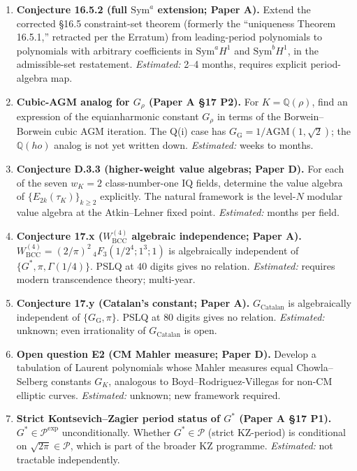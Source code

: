 \documentclass[11pt]{amsart}
\newcommand{\Gs}{G^{*}}
\newcommand{\GG}{G_{\!\scriptscriptstyle\mathrm{G}}}
\newcommand{\GK}{G_{K}}
\newcommand{\Q}{\mathbb{Q}}
\begin{document}
\begin{enumerate}[label=\textbf{(\Roman*)}, leftmargin=*, itemsep=4pt]
\item \textbf{Conjecture 16.5.2 (full $\mathrm{Sym}^{a}$ extension; Paper A).} Extend
the corrected \S 16.5 constraint-set theorem (formerly the ``uniqueness
Theorem 16.5.1,'' retracted per the Erratum) from leading-period
polynomials to polynomials with arbitrary coefficients in $\mathrm{Sym}^{a}H^{1}$
and $\mathrm{Sym}^{b}H^{1}$, in the admissible-set restatement. \emph{Estimated:} 2--4 months, requires
explicit period-algebra map.

\item \textbf{Cubic-AGM analog for $G_{\rho}$ (Paper A \S 17 P2).} For
$K = \Q(\rho)$, find an expression of the equianharmonic constant
$G_{\rho}$ in terms of the Borwein--Borwein cubic AGM iteration. The
Q(i) case has $\GG = 1/\mathrm{AGM}(1, \sqrt 2)$; the $\Q(
ho)$ analog is
not yet written down. \emph{Estimated:} weeks to months.

\item \textbf{Conjecture D.3.3 (higher-weight value algebras; Paper D).}
For each of the seven $w_K = 2$ class-number-one IQ fields, determine
the value algebra of $\{E_{2k}(\tau_K)\}_{k \geq 2}$ explicitly. The
natural framework is the level-$N$ modular value algebra at the
Atkin--Lehner fixed point. \emph{Estimated:} months per field.

\item \textbf{Conjecture 17.x ($W^{(4)}_{\mathrm{BCC}}$ algebraic
independence; Paper A).} $W^{(4)}_{\mathrm{BCC}} = (2/\pi)^{2}\,{}_4F_3(1/2^4; 1^3; 1)$
is algebraically independent of $\{\Gs, \pi, \Gamma(1/4)\}$. PSLQ at
$40$ digits gives no relation. \emph{Estimated:} requires modern
transcendence theory; multi-year.

\item \textbf{Conjecture 17.y (Catalan's constant; Paper A).}
$G_{\mathrm{Catalan}}$ is algebraically independent of $\{\GG, \pi\}$.
PSLQ at $80$ digits gives no relation. \emph{Estimated:} unknown;
even irrationality of $G_{\mathrm{Catalan}}$ is open.

\item \textbf{Open question E2 (CM Mahler measure; Paper D).} Develop a
tabulation of Laurent polynomials whose Mahler measures equal
Chowla--Selberg constants $\GK$, analogous to Boyd--Rodriguez-Villegas
for non-CM elliptic curves. \emph{Estimated:} unknown; new framework
required.

\item \textbf{Strict Kontsevich--Zagier period status of $\Gs$ (Paper A \S 17 P1).}
$\Gs \in \mathcal{P}^{\exp}$ unconditionally. Whether $\Gs \in \mathcal{P}$
(strict KZ-period) is conditional on $\sqrt{2\pi} \in \mathcal{P}$,
which is part of the broader KZ programme. \emph{Estimated:} not
tractable independently.
\end{enumerate}
\end{document}
